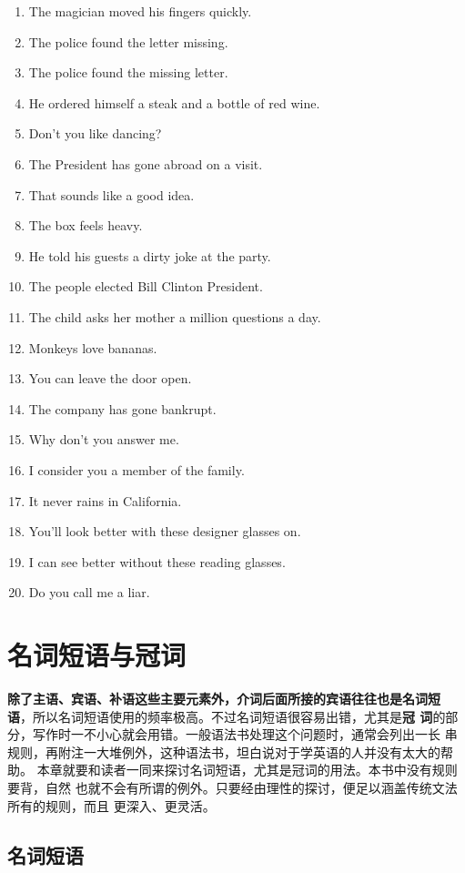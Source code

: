 \begin{enumerate}
\item The magician moved his fingers quickly.
\item The police found the letter missing.
\item The police found the missing letter.
\item He ordered himself a steak and a bottle of red wine.
\item Don't you like dancing?
\item The President has gone abroad on a visit.
\item That sounds like a good idea.
\item The box feels heavy.
\item He told his guests a dirty joke at the party.
\item The people elected Bill Clinton President.
\item The child asks her mother a million questions a day.
\item Monkeys love bananas.
\item You can leave the door open.
\item The company has gone bankrupt.
\item Why don't you answer me.
\item I consider you a member of the family.
\item It never rains in California.
\item You'll look better with these designer glasses on.
\item I can see better without these reading glasses.
\item Do you call me a liar.
\end{enumerate}


\chapter{名词短语与冠词}

\textbf{除了主语、宾语、补语这些主要元素外，介词后面所接的宾语往往也是名词短
  语}，所以名词短语使用的频率极高。不过名词短语很容易出错，尤其是\textbf{冠
  词}的部分，写作时一不小心就会用错。一般语法书处理这个问题时，通常会列出一长
串规则，再附注一大堆例外，这种语法书，坦白说对于学英语的人并没有太大的帮助。
本章就要和读者一同来探讨名词短语，尤其是冠词的用法。本书中没有规则要背，自然
也就不会有所谓的例外。只要经由理性的探讨，便足以涵盖传统文法所有的规则，而且
更深入、更灵活。

\section{名词短语}

